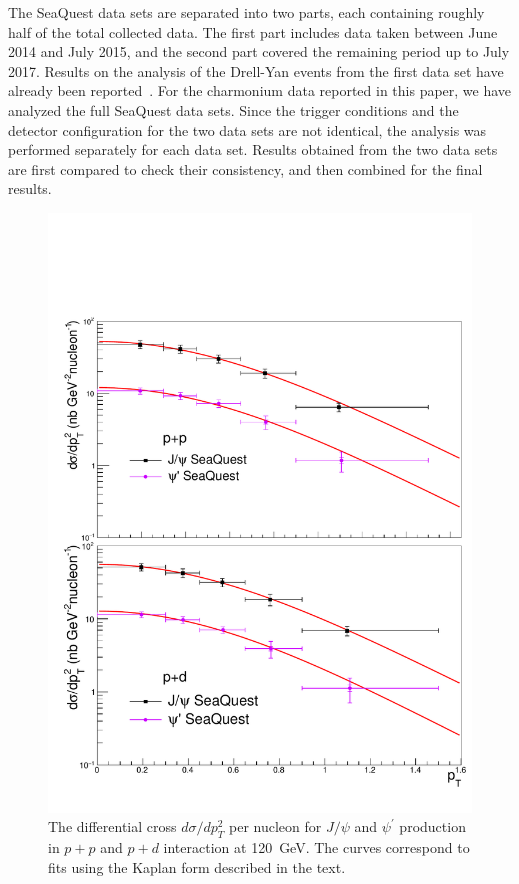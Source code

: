 \documentclass[reprint,aps,unsortedaddress,superscriptaddress,prd,floatfix,showpacs,linenumbers]{revtex4-2}
\begin{document}
The SeaQuest data sets are separated into two parts, each containing 
roughly half of the total collected data. The first part includes data 
taken between June 2014 and July 2015, and the second part covered the 
remaining period up to July 2017.
Results on the analysis of the Drell-Yan events from the first data set 
have already been reported~\cite{dove2021,dove2023}. For the charmonium data 
reported in this paper, we have analyzed the full SeaQuest data sets. 
Since the trigger conditions and the detector configuration for the two 
data sets are not identical, the analysis was performed
separately for each data set. Results obtained from the two data sets 
are first compared to check their consistency, and then combined for 
the final results.    

\begin{figure}[tb]
\includegraphics*[width=\linewidth]{crossSections/pT/cs_pT_full}
\caption{The differential cross
$d\sigma / d p^2_T$ per nucleon for $J/\psi$ and $\psi^\prime$
production in $p+p$ and $p+d$ interaction at \SI{120}{\GeV}.
The curves correspond to fits using the Kaplan form described in the
text.}
\label{fig:cs_pT}
\end{figure}
\end{document}
